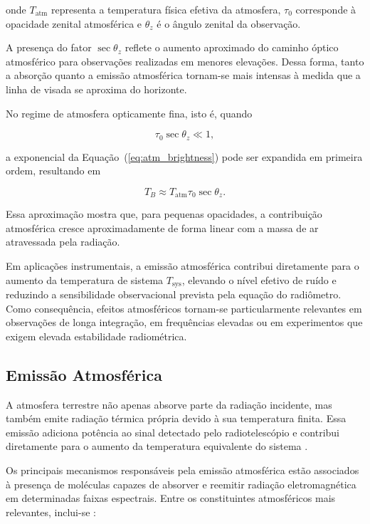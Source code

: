 onde \(T_{\mathrm{atm}}\) representa a temperatura física efetiva da atmosfera, \(\tau_0\) corresponde à opacidade zenital atmosférica e \(\theta_z\) é o ângulo zenital da observação.

A presença do fator \(\sec\theta_z\) reflete o aumento aproximado do caminho óptico atmosférico para observações realizadas em menores elevações. Dessa forma, tanto a absorção quanto a emissão atmosférica tornam-se mais intensas à medida que a linha de visada se aproxima do horizonte.

No regime de atmosfera opticamente fina, isto é, quando

\[
\tau_0 \sec\theta_z \ll 1,
\]

a exponencial da Equação~(\ref{eq:atm_brightness}) pode ser expandida em primeira ordem, resultando em

\begin{equation}
T_B \approx
T_{\mathrm{atm}}
\tau_0
\sec\theta_z.
\label{eq:atm_linear}
\end{equation}

Essa aproximação mostra que, para pequenas opacidades, a contribuição atmosférica cresce aproximadamente de forma linear com a massa de ar atravessada pela radiação.

Em aplicações instrumentais, a emissão atmosférica contribui diretamente para o aumento da temperatura de sistema \(T_{\mathrm{sys}}\), elevando o nível efetivo de ruído e reduzindo a sensibilidade observacional prevista pela equação do radiômetro. Como consequência, efeitos atmosféricos tornam-se particularmente relevantes em observações de longa integração, em frequências elevadas ou em experimentos que exigem elevada estabilidade radiométrica.

\subsection{Emissão Atmosférica}

A atmosfera terrestre não apenas absorve parte da radiação incidente, mas também emite radiação térmica própria devido à sua temperatura finita. Essa emissão adiciona potência ao sinal detectado pelo radiotelescópio e contribui diretamente para o aumento da temperatura equivalente do sistema \cite{thompson2017interferometry,Souza2024}.

Os principais mecanismos responsáveis pela emissão atmosférica estão associados à presença de moléculas capazes de absorver e reemitir radiação eletromagnética em determinadas faixas espectrais. Entre os constituintes atmosféricos mais relevantes, inclui-se \cite{wilson2013tools,thompson2017interferometry}:

